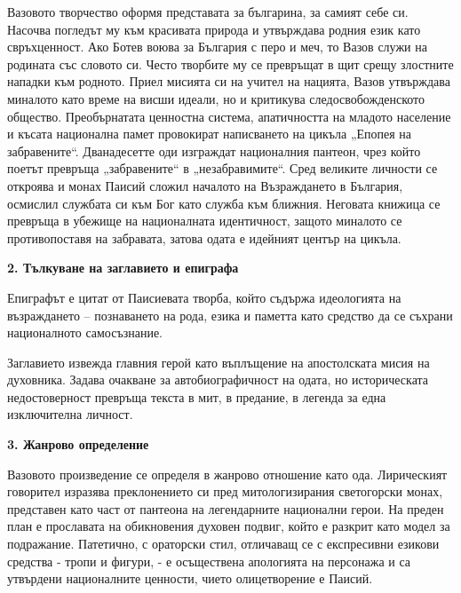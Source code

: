 \documentclass[12pt,a4paper]{article}
\begin{document}
\indent Вазовото творчество оформя представата за българина, за самият себе си. Насочва погледът му към красивата природа и утвърждава родния език като свръхценност. Ако Ботев воюва за България с перо и меч, то Вазов служи на родината със словото си. Често творбите му се превръщат в щит срещу злостните нападки към родното. Приел мисията си на учител на нацията, Вазов утвърждава миналото като време на висши идеали, но и критикува следосвобожденското общество. Преобърнатата ценностна система, апатичността на младото население и късата национална памет провокират написването на цикъла „Епопея на забравените“. Дванадесетте оди изграждат националния пантеон, чрез който поетът превръща „забравените“ в „незабравимите“. Сред великите личности се откроява и монах Паисий сложил началото на Възраждането в България, осмислил службата си към Бог като служба към ближния. Неговата книжица се превръща в убежище на националната идентичност, защото миналото се противопоставя на забравата, затова одата е идейният център на цикъла.
\vspace{0.1cm}
 
\textbf{2. Тълкуване на заглавието и епиграфа}
\vspace{0.1cm}
 
\indent Епиграфът е цитат от Паисиевата творба, който съдържа идеологията на възраждането –  познаването на рода, езика и паметта като средство да се съхрани националното самосъзнание.
\vspace{0.1cm}
 
\indent Заглавието извежда главния герой като въплъщение на апостолската мисия на духовника. Задава очакване за автобиографичност на одата, но историческата недостоверност превръща текста в мит, в предание, в легенда за една изключителна личност.
\vspace{0.1cm}
 
\textbf{3. Жанрово определение}
\vspace{0.1cm}
 
\indent Вазовото произведение се определя в жанрово отношение като ода. Лирическият говорител изразява преклонението си пред митологизирания светогорски монах, представен като част от пантеона на легендарните национални герои. На преден план е прославата на обикновения духовен подвиг, който е разкрит като модел за подражание. Патетично, с ораторски стил, отличаващ се с експресивни езикови средства - тропи и фигури, - е осъществена апологията на персонажа и са утвърдени националните ценности, чието олицетворение е Паисий.
\vspace{0.1cm}
 
\end{document}
